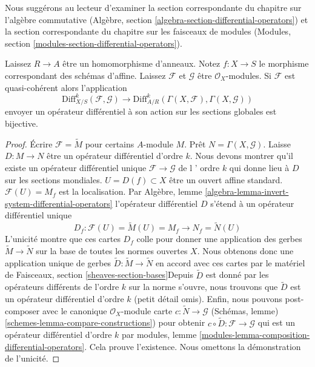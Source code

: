 \noindent
Nous suggérons au lecteur d'examiner la section correspondante du chapitre sur l'algèbre commutative (Algèbre, section \ref{algebra-section-differential-operators}) et la section correspondante du chapitre sur les faisceaux de modules (Modules, section \ref{modules-section-differential-operators}).

\begin{lemma}

\label{lemma-affine-case-differential-operators}
Laissez $R \to A$ être un homomorphisme d'anneaux. Notez $f : X \to S$ le morphisme correspondant des schémas d'affine. Laissez $\mathcal{F}$ et $\mathcal{G}$ être $\mathcal{O}_X$-modules. Si $\mathcal{F}$ est quasi-cohérent alors l'application $$
\text{Diff}^k_{X/S}(\mathcal{F}, \mathcal{G}) \to
\text{Diff}^k_{A/R}(\Gamma(X, \mathcal{F}), \Gamma(X, \mathcal{G}))
$$ envoyer un opérateur différentiel à son action sur les sections globales est bijective.
\end{lemma}

\begin{proof}

Écrire $\mathcal{F} = \widetilde{M}$ pour certains $A$-module $M$. Prêt
$N = \Gamma(X, \mathcal{G})$. Laisse $D : M \to N$ être un opérateur différentiel d'ordre $k$. Nous devons montrer qu'il existe un opérateur différentiel unique $\mathcal{F} \to \mathcal{G}$ de l ' ordre $k$
qui donne lieu à $D$ sur les sections mondiales. $U = D(f) \subset X$
être un ouvert affine standard. $\mathcal{F}(U) = M_f$ est la localisation. Par Algèbre, lemme \ref{algebra-lemma-invert-system-differential-operators}
l'opérateur différentiel $D$ s'étend à un opérateur différentiel unique
$$
D_f : \mathcal{F}(U) = \widetilde{M}(U) = M_f \to N_f = \widetilde{N}(U)
$$
L'unicité montre que ces cartes $D_f$ colle pour donner une application des gerbes
$\widetilde{M} \to \widetilde{N}$ sur la base de toutes les normes ouvertes $X$. Nous obtenons donc une application unique de gerbes
$\widetilde{D} : \widetilde{M} \to \widetilde{N}$ en accord avec ces cartes par le matériel de Faisceaux, section \ref{sheaves-section-bases}Depuis $\widetilde{D}$ est donné par les opérateurs différents de l'ordre $k$ sur la norme s'ouvre, nous trouvons que $\widetilde{D}$ est un opérateur différentiel d'ordre $k$ (petit détail omis). Enfin, nous pouvons post-composer avec le canonique $\mathcal{O}_X$-module carte
$c : \widetilde{N} \to \mathcal{G}$
(Schémas, lemme) \ref{schemes-lemma-compare-constructions}) pour obtenir $c \circ \widetilde{D} : \mathcal{F} \to \mathcal{G}$
qui est un opérateur différentiel d'ordre $k$ par modules, lemme \ref{modules-lemma-composition-differential-operators}. Cela prouve l'existence. Nous omettons la démonstration de l'unicité.

\end{proof}


